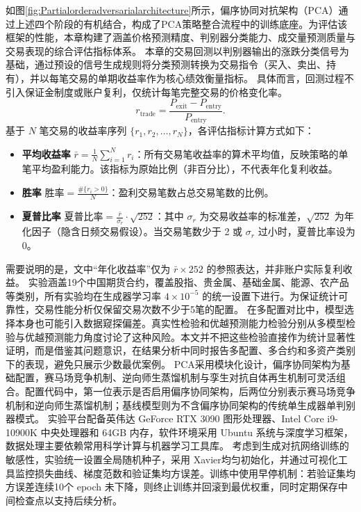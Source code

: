 如图\ref{fig:Partialorderadversarialarchitecture}所示，偏序协同对抗架构（PCA）通过上述四个阶段的有机结合，构成了PCA策略整合流程中的训练底座。为评估该框架的性能，本章构建了涵盖价格预测精度、判别器分类能力、成交量预测质量与交易表现的综合评估指标体系。
本章的交易回测以判别器输出的涨跌分类信号为基础，通过预设的信号生成规则将分类预测转换为交易指令（买入、卖出、持有），并以每笔交易的单期收益率作为核心绩效衡量指标。
具体而言，回测过程不引入保证金制度或账户复利，仅统计每笔完整交易的价格变化率。\begin{equation}
r_{\text{trade}} = \frac{P_{\text{exit}} - P_{\text{entry}}}{P_{\text{entry}}}.
\end{equation}
基于 $N$ 笔交易的收益率序列 $\{r_1, r_2, \dots, r_N\}$，各评估指标计算方式如下：
\begin{itemize}
  \item \textbf{平均收益率} $\bar r = \frac{1}{N}\sum_{i=1}^{N} r_i$：所有交易笔收益率的算术平均值，反映策略的单笔平均盈利能力。该指标为原始比例（非百分比），不代表年化复利收益。
  \item \textbf{胜率} $\text{胜率} = \frac{\#\{r_i > 0\}}{N}$：盈利交易笔数占总交易笔数的比例。
  \item \textbf{夏普比率} $\text{夏普比率} = \frac{\bar r}{\sigma_r} \cdot \sqrt{252}$：其中 $\sigma_r$ 为交易收益率的标准差，$\sqrt{252}$ 为年化因子（隐含日频交易假设）。当交易笔数少于 2 或 $\sigma_r$ 过小时，夏普比率设为 0。
\end{itemize}

需要说明的是，文中“年化收益率”仅为 $\bar r \times 252$ 的参照表达，并非账户实际复利收益。
实验涵盖19个中国期货合约，覆盖股指、贵金属、基础金属、能源、农产品等类别，所有实验均在生成器学习率 $4\times10^{-5}$ 的统一设置下进行。为保证统计可靠性，交易性能分析仅保留交易次数不少于5笔的配置。
在多配置对比中，模型选择本身也可能引入数据窥探偏差。真实性检验和优越预测能力检验分别从多模型检验与优越预测能力角度讨论了这种风险\cite{white2000realitycheck,hansen2005spa}。本文并不把这些检验直接作为统计显著性证明，而是借鉴其问题意识，在结果分析中同时报告多配置、多合约和多资产类别下的表现，避免只展示少数最优案例。
PCA采用模块化设计，偏序协同架构为基础配置，赛马场竞争机制、逆向师生蒸馏机制与孪生对抗自体再生机制可灵活组合。配置代码中，第一位表示是否启用偏序协同架构，后两位分别表示赛马场竞争机制和逆向师生蒸馏机制；基线模型则为不含偏序协同架构的传统单生成器单判别器模式。
实验平台配备英伟达 GeForce RTX 3090 图形处理器、Intel Core i9-10900K 中央处理器和 64GB 内存，软件环境采用 Ubuntu 系统与深度学习框架，数据处理主要依赖常用科学计算与机器学习工具库。
考虑到生成对抗网络训练的敏感性，实验统一设置全局随机种子，采用 Xavier均匀初始化，并通过可视化工具监控损失曲线、梯度范数和验证集均方误差。训练中使用早停机制：若验证集均方误差连续10个 epoch 未下降，则终止训练并回滚到最优权重，同时定期保存中间检查点以支持后续分析。

